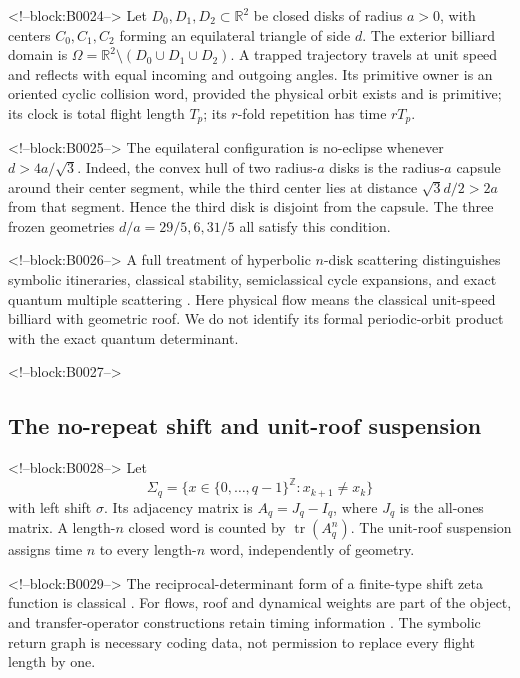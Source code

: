 \documentclass[11pt,a4paper]{article}
\theoremstyle{definition}
\theoremstyle{remark}
\newcommand{\tr}{\operatorname{tr}}
\begin{document}
<!--block:B0024-->
Let \(D_0,D_1,D_2\subset\mathbb R^2\) be closed disks of radius \(a>0\), with centers \(C_0,C_1,C_2\) forming an equilateral triangle of side \(d\). The exterior billiard domain is
\(\Omega=\mathbb R^2\setminus(D_0\cup D_1\cup D_2)\). A trapped trajectory travels at unit speed and reflects with equal incoming and outgoing angles. Its primitive owner is an oriented cyclic collision word, provided the physical orbit exists and is primitive; its clock is total flight length \(T_p\); its \(r\)-fold repetition has time \(rT_p\).

<!--block:B0025-->
The equilateral configuration is no-eclipse whenever \(d>4a/\sqrt3\).
Indeed, the convex hull of two radius-\(a\) disks is the radius-\(a\)
capsule around their center segment, while the third center lies at distance
\(\sqrt3d/2>2a\) from that segment.  Hence the third disk is disjoint from
the capsule.  The three frozen geometries \(d/a=29/5,6,31/5\) all satisfy
this condition.

<!--block:B0026-->
A full treatment of hyperbolic \(n\)-disk scattering distinguishes symbolic itineraries, classical stability, semiclassical cycle expansions, and exact quantum multiple scattering \citep[Secs.~2--4]{Wirzba1999}. Here physical flow means the classical unit-speed billiard with geometric roof. We do not identify its formal periodic-orbit product with the exact quantum determinant.

<!--block:B0027-->
\subsection{The no-repeat shift and unit-roof suspension}

<!--block:B0028-->
Let
\[
 \Sigma_q=\{x\in\{0,\ldots,q-1\}^{\mathbb Z}:x_{k+1}\ne x_k\}
\]
with left shift \(\sigma\). Its adjacency matrix is \(A_q=J_q-I_q\), where \(J_q\) is the all-ones matrix. A length-\(n\) closed word is counted by \(\tr(A_q^n)\). The unit-roof suspension assigns time \(n\) to every length-\(n\) word, independently of geometry.

<!--block:B0029-->
The reciprocal-determinant form of a finite-type shift zeta function is classical \citep[pp.~43--49]{BowenLanford1970}.
For flows, roof and dynamical weights are part of the object, and transfer-operator constructions retain timing information \citep[Secs.~1--3]{Ruelle1976}. The symbolic return graph is necessary coding data, not permission to replace every flight length by one.
\end{document}

